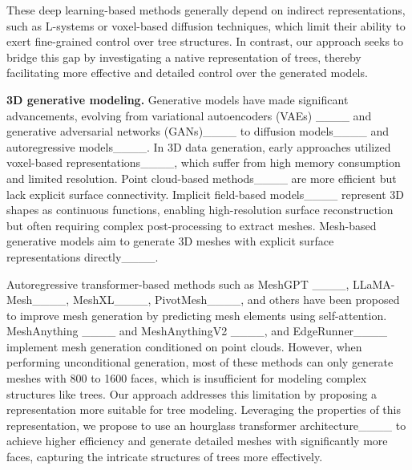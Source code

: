 These deep learning-based methods generally depend on indirect representations, such as L-systems or voxel-based diffusion techniques, which limit their ability to exert fine-grained control over tree structures. In contrast, our approach seeks to bridge this gap by investigating a native representation of trees, thereby facilitating more effective and detailed control over the generated models.


\noindent\textbf{3D generative modeling.}
Generative models have made significant advancements, evolving from variational autoencoders (VAEs) ____ and generative adversarial networks (GANs)____ to diffusion models____ and autoregressive models____. 
In 3D data generation, early approaches utilized voxel-based representations____, which suffer from high memory consumption and limited resolution. Point cloud-based methods____ are more efficient but lack explicit surface connectivity. Implicit field-based models____ represent 3D shapes as continuous functions, enabling high-resolution surface reconstruction but often requiring complex post-processing to extract meshes. Mesh-based generative models aim to generate 3D meshes with explicit surface representations directly____. 

Autoregressive transformer-based methods such as MeshGPT ____, LLaMA-Mesh____, MeshXL____, PivotMesh____, and others have been proposed to improve mesh generation by predicting mesh elements using self-attention. MeshAnything ____ and MeshAnythingV2 ____, and EdgeRunner____ implement mesh generation conditioned on point clouds. However, when performing unconditional generation, most of these methods can only generate meshes with 800 to 1600 faces, which is insufficient for modeling complex structures like trees.
%
Our approach addresses this limitation by proposing a representation more suitable for tree modeling. Leveraging the properties of this representation, we propose to use an hourglass transformer architecture____ to achieve higher efficiency and generate detailed meshes with significantly more faces, capturing the intricate structures of trees more effectively.